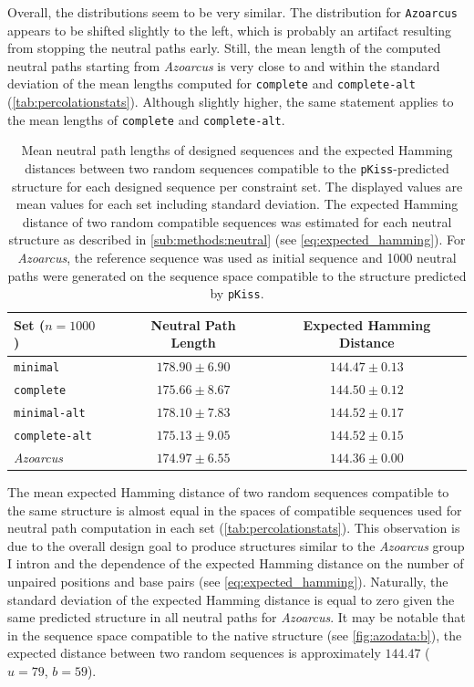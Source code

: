 \documentclass[../../master.tex]{subfiles}
\begin{document}
Overall, the distributions seem to be very similar.
The distribution for \texttt{Azoarcus} appears to be shifted slightly to the left, which is probably an artifact resulting from stopping the neutral paths early.
Still, the mean length of the computed neutral paths starting from \textit{Azoarcus} is very close to and within the standard deviation of the mean lengths computed for \texttt{complete} and \texttt{complete-alt} (\autoref{tab:percolationstats}).
Although slightly higher, the same statement applies to the mean lengths of \texttt{complete} and \texttt{complete-alt}.

\begin{table}[!ht]
	\centering{}
	\caption[Mean Neutral Path Lengths and Expected Random Hamming Distances]{
		Mean neutral path lengths of designed sequences and the expected Hamming distances between two random sequences compatible to the \texttt{pKiss}-predicted structure for each designed sequence per constraint set.
		The displayed values are mean values for each set including standard deviation.
		The expected Hamming distance of two random compatible sequences was estimated for each neutral structure as described in \autoref{sub:methods:neutral} (see \autoref{eq:expected_hamming}). 
		For \textit{Azoarcus}, the reference sequence was used as initial sequence and 1000 neutral paths were generated on the sequence space compatible to the structure predicted by \texttt{pKiss}.
	}
	\label{tab:percolationstats}
	\begin{tabularx}{\textwidth}{lXcc} \toprule
		\textbf{Set} ($n=1000$) && Neutral Path Length & Expected Hamming Distance \\ \midrule
		\texttt{minimal} && $ 178.90 \pm 6.90 $ & $ 144.47 \pm 0.13 $  \\
		\texttt{complete} && $ 175.66 \pm 8.67 $  & $ 144.50 \pm 0.12 $  \\
		\texttt{minimal-alt} && $ 178.10 \pm 7.83 $  & $ 144.52 \pm 0.17 $  \\
		\texttt{complete-alt} && $ 175.13 \pm 9.05 $  & $ 144.52 \pm 0.15 $  \\
		\midrule
		\textit{Azoarcus} && $ 174.97 \pm 6.55 $  & $ 144.36 \pm 0.00 $  \\ 
		\bottomrule
	\end{tabularx}
\end{table}

The mean expected Hamming distance of two random sequences compatible to the same structure is almost equal in the spaces of compatible sequences used for neutral path computation in each set (\autoref{tab:percolationstats}).
This observation is due to the overall design goal to produce structures similar to the \textit{Azoarcus} group I intron and the dependence of the expected Hamming distance on the number of unpaired positions and base pairs (see \autoref{eq:expected_hamming}).
Naturally, the standard deviation of the expected Hamming distance is equal to zero given the same predicted structure in all neutral paths for \textit{Azoarcus}.
It may be notable that in the sequence space compatible to the native structure (see \autoref{fig:azodata:b}), the expected distance between two random sequences is approximately $144.47$ ($u=79$, $b=59$).
\end{document}
